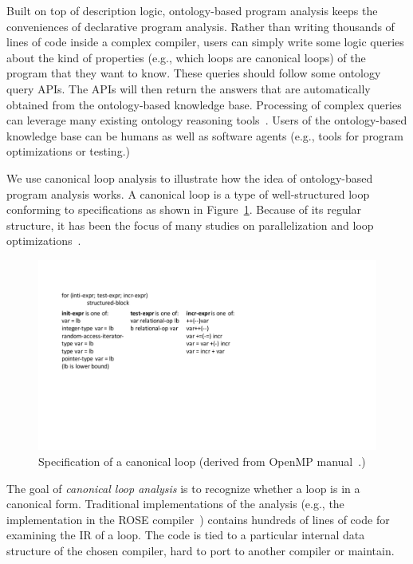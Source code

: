 Built on top of description logic, ontology-based program analysis
keeps the conveniences of declarative program analysis. Rather than
writing thousands of lines of code inside a complex compiler, users
can simply write some logic queries about the kind of properties
(e.g., which loops are canonical loops) of the program that they want
to know. These queries should follow some ontology query APIs. The
APIs will then return the answers that are automatically obtained from
the ontology-based knowledge base. Processing of complex queries can
leverage many existing ontology reasoning
tools~\cite{wielemaker2011,tsarkov2006fact++}.  Users
of the ontology-based knowledge base can be humans as well as software
agents (e.g., tools for program optimizations or testing.)

\vspace*{.1in}
 We use canonical loop analysis to illustrate
how the idea of ontology-based program analysis works. A canonical
loop is a type of well-structured loop conforming to specifications as
shown in Figure~\ref{fig:canonical}.  Because of its regular
structure, it has been the focus of many studies on parallelization
and loop
optimizations~\cite{kandemir1999improving,LiaoSemantic-aware2010,DaMata2013}.

\begin{figure}[h]
\centering
\includegraphics[width=.7\columnwidth]{graph/cl-def.pdf}
\caption{Specification of a canonical loop (derived from OpenMP
  manual~\cite{openmp13}.)
}
\label{fig:canonical}
\end{figure}

The goal of {\em canonical loop analysis} is to recognize whether a
loop is in a canonical form.  Traditional implementations of the
analysis (e.g., the implementation in the ROSE compiler~\cite{ROSE})
contains hundreds of lines of code for examining the IR of a loop. The
code is tied to a particular internal data structure of the chosen
compiler, hard to port to another compiler or maintain.

